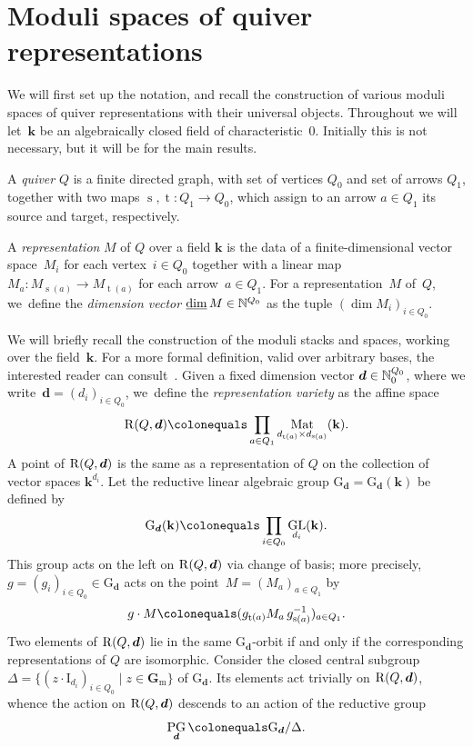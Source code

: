 \documentclass[11pt]{article}
\theoremstyle{plain}
\theoremstyle{definition}
\DeclareMathOperator\dimvect{\underline{\operatorname{dim}}}
\DeclareMathOperator\GL{GL}
\DeclareMathOperator\Mat{Mat}
\DeclareMathOperator\PG{PG}
\DeclareMathOperator\source{s}
\DeclareMathOperator\target{t}
\newcommand\field{\mathbf{k}}
\newcommand\Gm{\ensuremath{\mathbf{G}_{\mathrm{m}}}}
\newcommand\group[1][\tuple{d}]{\mathrm{G}_{#1}}
\newcommand\tuple[1]{\ensuremath{{\boldsymbol{#1}}}}
\begin{document}
\section{Moduli spaces of quiver representations}
\label{section:moduli}

We will first set up the notation,
and recall the construction of various moduli spaces of quiver representations
with their universal objects.
Throughout we will let~$\field$ be an algebraically closed field of characteristic~0.
Initially this is not necessary, but it will be for the main results.

A \emph{quiver} $Q$ is a finite directed graph,
with set of vertices $Q_0$ and set of arrows $Q_1$,
together with two maps $\source, \target\colon Q_1 \to Q_0$,
which assign to an arrow $a \in Q_1$ its source and target, respectively.

A \emph{representation} $M$ of $Q$ over a field $\field$
is the data of a finite-dimensional vector space~$M_i$
for each vertex~$i \in Q_0$
together with a linear map~$M_a\colon M_{\source(a)} \to M_{\target(a)}$
for each arrow~$a \in Q_1$.
For a representation~$M$ of~$Q$, we~define the \emph{dimension vector} $\dimvect M \in \smash{\mathbb{N}^{Q_0}}$ as the tuple $(\dim M_i)_{i \in Q_0}$.

We will briefly recall the construction of the moduli stacks and spaces,
working over the field~$\field$.
For a more formal definition,
valid over arbitrary bases,
the interested reader can consult~\cite[\S3]{2210.00033v1}.
Given a fixed dimension vector $\tuple{d} \in \smash{\mathbb{N}_0^{Q_0}}$,
where we write~$\tuple{d}=(d_i)_{i\in Q_0}$, we~define the \emph{representation variety}
as the affine space
\begin{equation}
\label{equation:representation-variety}
\repspace{Q,\tuple{d}}\colonequals \prod_{a \in Q_1} \Mat_{d_{\target(a)} \times d_{\source(a)}}(\field).
\end{equation}
A point of $\repspace{Q,\tuple{d}}$ is the same as a representation of $Q$ on the collection of vector spaces $\field^{d_i}$.
Let the reductive linear algebraic group $\group=\group(\field)$ be defined by
\begin{equation*}
\group(\field)\colonequals \prod_{i \in Q_0} \GL_{d_i}(\field).
\end{equation*}
This group acts on the left on $\repspace{Q,\tuple{d}}$ via change of basis;
more precisely,
$g = (g_i)_{i \in Q_0}\in\group$ acts on the point~$M = (M_a)_{a \in Q_1}$ by
\begin{equation*}
g\cdot M \colonequals (g_{\target(a)}M_a\,g_{\source(a)}^{-1})_{a \in Q_1}.
\end{equation*}
Two elements of $\repspace{Q,\tuple{d}}$ lie in the same $\group$-orbit
if and only if the corresponding representations of $Q$ are isomorphic.
Consider the closed central subgroup \hbox{$\Delta = \{(z\cdot \mathrm{I}_{d_i})_{i \in Q_0} \mid z \in \Gm\}$} of $\group$.
Its elements act trivially on $\repspace{Q,\tuple{d}}$,
whence the action on $\repspace{Q,\tuple{d}}$ descends to an action of the reductive group
\begin{equation*}
\PG_{\tuple{d}} \colonequals \group/\Delta.
\end{equation*}
\end{document}
